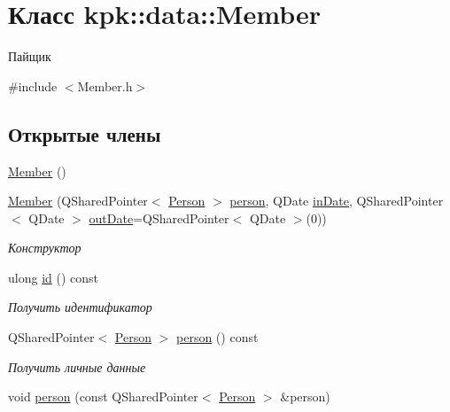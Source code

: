 \hypertarget{classkpk_1_1data_1_1_member}{}\section{Класс kpk\+:\+:data\+:\+:Member}
\label{classkpk_1_1data_1_1_member}


Пайщик  




{\ttfamily \#include $<$Member.\+h$>$}

\subsection*{Открытые члены}
\begin{DoxyCompactItemize}
\item 
\hyperlink{classkpk_1_1data_1_1_member_a956b11ac722db41cc8faba6132cf0575}{Member} ()
\item 
\hyperlink{classkpk_1_1data_1_1_member_a2428e2f78396b9f73c0dd13ebc115e3e}{Member} (Q\+Shared\+Pointer$<$ \hyperlink{classkpk_1_1data_1_1_person}{Person} $>$ \hyperlink{classkpk_1_1data_1_1_member_ab0c0a5366587471cbae89d6519dc018d}{person}, Q\+Date \hyperlink{classkpk_1_1data_1_1_member_a94ae4a3def291913ce30f0e56f5211b3}{in\+Date}, Q\+Shared\+Pointer$<$ Q\+Date $>$ \hyperlink{classkpk_1_1data_1_1_member_ae8bacb7088f395e07899af07d1a3956d}{out\+Date}=Q\+Shared\+Pointer$<$ Q\+Date $>$(0))
\begin{DoxyCompactList}\small\item\em Конструктор \end{DoxyCompactList}\item 
ulong \hyperlink{classkpk_1_1data_1_1_member_a374daa48edaf5fedb31c96edfd87f931}{id} () const 
\begin{DoxyCompactList}\small\item\em Получить идентификатор \end{DoxyCompactList}\item 
Q\+Shared\+Pointer$<$ \hyperlink{classkpk_1_1data_1_1_person}{Person} $>$ \hyperlink{classkpk_1_1data_1_1_member_ab0c0a5366587471cbae89d6519dc018d}{person} () const 
\begin{DoxyCompactList}\small\item\em Получить личные данные \end{DoxyCompactList}\item 
void \hyperlink{classkpk_1_1data_1_1_member_a39304b23df8b1771a475fbf886929201}{person} (const Q\+Shared\+Pointer$<$ \hyperlink{classkpk_1_1data_1_1_person}{Person} $>$ \&person)

\end{DoxyCompactItemize}
